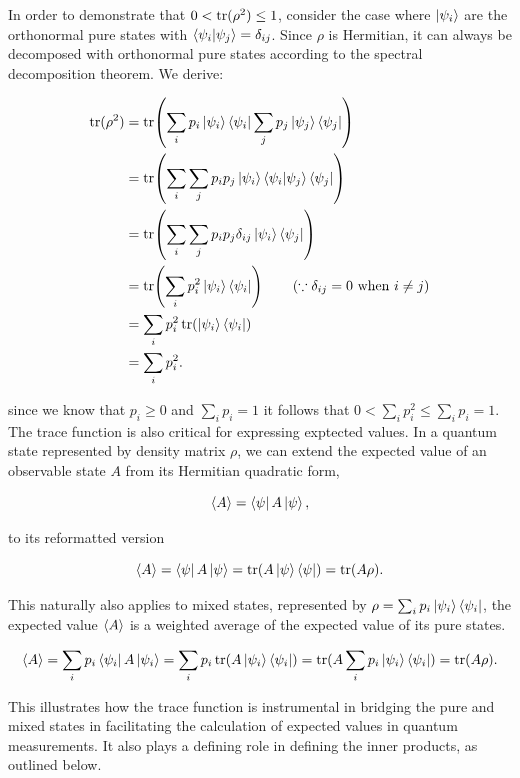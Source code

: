 \documentclass[12pt]{article}
\begin{document}
In order to demonstrate that $0 < \operatorname{tr}(\rho^2) \leq 1$, consider the case where ${\ket{\psi_i}}$ are the orthonormal pure states with $\braket{\psi_i}{\psi_j} = \delta_{ij}$. Since $\rho$ is Hermitian, it can always be decomposed with orthonormal pure states according to the spectral decomposition theorem. We derive:

\begin{align*}
\operatorname{tr}(\rho^{2})
&= \operatorname{tr}\!\left( \sum_{i} p_{i} \ket{\psi_{i}}\bra{\psi_{i}} \sum_{j} p_{j} \ket{\psi_{j}}\bra{\psi_{j}} \right) \\
&= \operatorname{tr}\!\left( \sum_{i} \sum_{j} p_{i} p_{j} \ket{\psi_{i}}\bra{\psi_{i}} \ket{\psi_{j}}\bra{\psi_{j}} \right) \\
&= \operatorname{tr}\!\left( \sum_{i} \sum_{j} p_{i} p_{j} \delta_{ij} \ket{\psi_{i}}\bra{\psi_{j}} \right) \\
&= \operatorname{tr}\!\left( \sum_{i} p_{i}^{2} \ket{\psi_{i}}\bra{\psi_{i}} \right)
\qquad (\because \delta_{ij} = 0 \text{ when } i \neq j) \\
&= \sum_{i} p_{i}^{2} \operatorname{tr}\!\left( \ket{\psi_{i}}\bra{\psi_{i}} \right) \\
&= \sum_{i} p_{i}^{2}.
\end{align*}

since we know that $p_i \geq 0$ and $\sum_{i} p_i = 1$ it follows that $0 < \sum_{i} p^2_i \leq \sum_{i} p_i= 1$. The trace function is also critical for expressing exptected values. In a quantum state represented by density matrix $\rho$, we can extend the expected value of an observable state $A$ from its Hermitian quadratic form, 

$$\left\langle {A} \right\rangle = \bra{\psi} A \ket{\psi}, $$

to its reformatted version

$$\left\langle {A} \right\rangle = \bra{\psi} A \ket{\psi} = \operatorname{tr}(A \ket{\psi} \bra{\psi}) = \operatorname{tr}(A \rho).$$

This naturally also applies to mixed states, represented by $\rho = \sum_i p_i \ket{\psi_i} \bra{\psi_i}$, the expected value $\left\langle {A} \right\rangle$ is a weighted average of the expected value of its pure states.

$$\left\langle {A} \right\rangle = \sum_{i} p_i \bra{\psi_i} A \ket{\psi_i} = \sum_{i} p_i \operatorname{tr}(A \ket{\psi_i} \bra{\psi_i}) = \operatorname{tr}(A \sum_{i} p_i \ket{\psi_i} \bra{\psi_i}) = \operatorname{tr}(A\rho).$$

This illustrates how the trace function is instrumental in bridging the pure and mixed states in facilitating the calculation of expected values in quantum measurements. It also plays a defining role in defining the inner products, as outlined below. 
\end{document}
